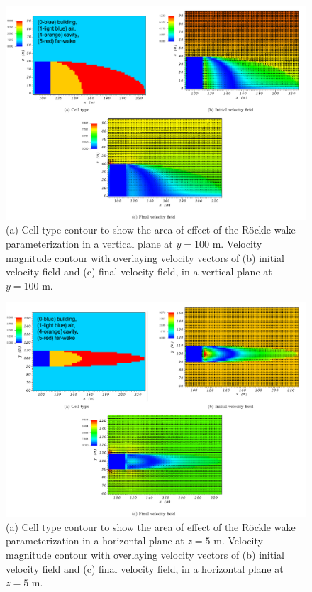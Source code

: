 \begin{figure}[H]
    \centering
    \includegraphics[width=\textwidth]{Images/wake_y_100_1.pdf}
    \caption{(a) Cell type contour to show the area of effect of the R\"{o}ckle wake parameterization in a vertical plane at $y=100$ m. Velocity magnitude contour with overlaying velocity vectors of (b) initial velocity field and (c) final velocity field, in a vertical plane at $y=100$ m.}
\end{figure}

\begin{figure}[H]
    \centering
    \includegraphics[width=\textwidth]{Images/wake_z_5_1.pdf}
    \caption{(a) Cell type contour to show the area of effect of the R\"{o}ckle wake parameterization in a horizontal plane at $z=5$ m. Velocity magnitude contour with overlaying velocity vectors of (b) initial velocity field and (c) final velocity field, in a horizontal plane at $z=5$ m.}
\end{figure}

